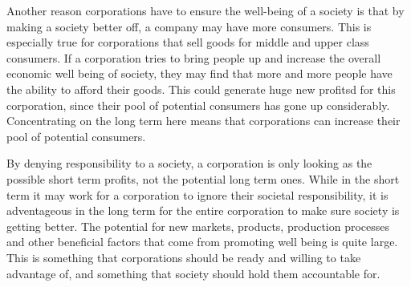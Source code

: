 Another reason corporations have to ensure the well-being of a society is that by making a society better off, a company may have more consumers.
This is especially true for corporations that sell goods for middle and upper class consumers.
If a corporation tries to bring people up and increase the overall economic well being of society, they may find that more and more people have the ability to afford their goods.
This could generate huge new profitsd for this corporation, since their pool of potential consumers has gone up considerably.
Concentrating on the long term here means that corporations can increase their pool of potential consumers.

By denying responsibility to a society, a corporation is only looking as the possible short term profits, not the potential long term ones.
While in the short term it may work for a corporation to ignore their societal responsibility, it is adventageous in the long term for the entire corporation to make sure society is getting better.
The potential for new markets, products, production processes and other beneficial factors that come from promoting well being is quite large.
This is something that corporations should be ready and willing to take advantage of, and something that society should hold them accountable for.